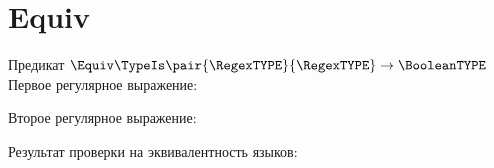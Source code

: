 \section{Equiv}
\begin{frame}{Предикат $\Equiv\TypeIs\pair{\RegexTYPE}{\RegexTYPE}\to\BooleanTYPE$}
	Первое регулярное выражение:

	Второе регулярное выражение:

	Результат проверки на эквивалентность языков:



\end{frame}

